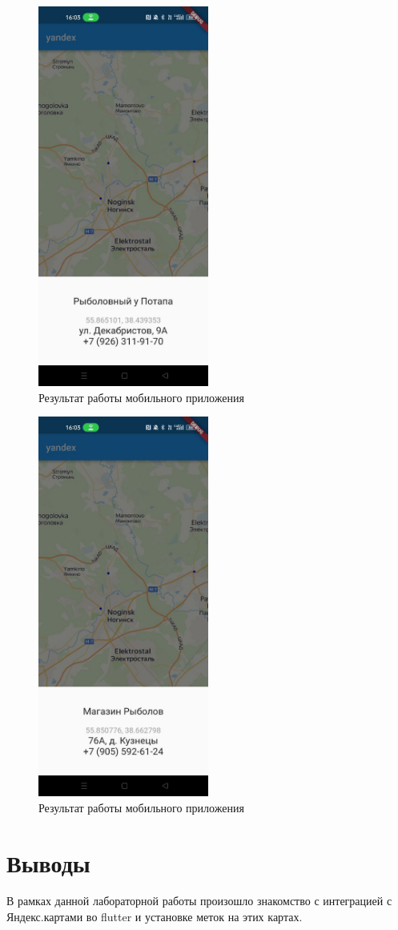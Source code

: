 \documentclass[a4paper, 14pt]{extarticle}
\begin{document}
\begin{figure}[H]
\centering
\includegraphics[width=0.5\textwidth]{images/res2.jpg}
\caption{Результат работы мобильного приложения}
\label{fig:img2}
\end{figure}

\begin{figure}[H]
\centering
\includegraphics[width=0.5\textwidth]{images/res3.jpg}
\caption{Результат работы мобильного приложения}
\label{fig:img3}
\end{figure}


\section{Выводы}
В рамках данной лабораторной работы произошло знакомство с интеграцией с Яндекс.картами во flutter и установке меток на этих картах.
\end{document}

